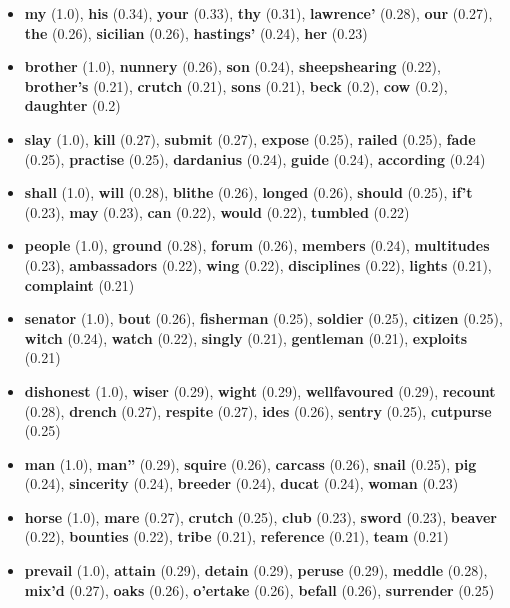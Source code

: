 \documentclass[answers]{exam}
\begin{document}
\begin{questions}
\begin{parts}
\begin{solution}
\begin{itemize}
\item \textbf{my} (1.0), \textbf{his} (0.34), \textbf{your} (0.33), \textbf{thy}
    (0.31), \textbf{lawrence’} (0.28), \textbf{our} (0.27), \textbf{the} (0.26),
    \textbf{sicilian} (0.26), \textbf{hastings’} (0.24), \textbf{her} (0.23)
\item \textbf{brother} (1.0), \textbf{nunnery} (0.26), \textbf{son} (0.24),
    \textbf{sheepshearing} (0.22), \textbf{brother’s} (0.21), \textbf{crutch}
    (0.21), \textbf{sons} (0.21), \textbf{beck} (0.2), \textbf{cow} (0.2),
    \textbf{daughter} (0.2)
\item \textbf{slay} (1.0), \textbf{kill} (0.27), \textbf{submit} (0.27),
    \textbf{expose} (0.25), \textbf{railed} (0.25), \textbf{fade} (0.25),
    \textbf{practise} (0.25), \textbf{dardanius} (0.24), \textbf{guide} (0.24),
    \textbf{according} (0.24)
\item \textbf{shall} (1.0), \textbf{will} (0.28), \textbf{blithe} (0.26),
    \textbf{longed} (0.26), \textbf{should} (0.25), \textbf{if’t} (0.23),
    \textbf{may} (0.23), \textbf{can} (0.22), \textbf{would} (0.22),
    \textbf{tumbled} (0.22)
\item \textbf{people} (1.0), \textbf{ground} (0.28), \textbf{forum} (0.26),
    \textbf{members} (0.24), \textbf{multitudes} (0.23), \textbf{ambassadors}
    (0.22), \textbf{wing} (0.22), \textbf{disciplines} (0.22), \textbf{lights}
    (0.21), \textbf{complaint} (0.21)
\item \textbf{senator} (1.0), \textbf{bout} (0.26), \textbf{fisherman} (0.25),
    \textbf{soldier} (0.25), \textbf{citizen} (0.25), \textbf{witch} (0.24),
    \textbf{watch} (0.22), \textbf{singly} (0.21), \textbf{gentleman} (0.21),
    \textbf{exploits} (0.21)
\item \textbf{dishonest} (1.0), \textbf{wiser} (0.29), \textbf{wight} (0.29),
    \textbf{wellfavoured} (0.29), \textbf{recount} (0.28), \textbf{drench}
    (0.27), \textbf{respite} (0.27), \textbf{ides} (0.26), \textbf{sentry}
    (0.25), \textbf{cutpurse} (0.25)
\item \textbf{man} (1.0), \textbf{man”} (0.29), \textbf{squire} (0.26),
    \textbf{carcass} (0.26), \textbf{snail} (0.25), \textbf{pig} (0.24),
    \textbf{sincerity} (0.24), \textbf{breeder} (0.24), \textbf{ducat} (0.24),
    \textbf{woman} (0.23)
\item \textbf{horse} (1.0), \textbf{mare} (0.27), \textbf{crutch} (0.25),
    \textbf{club} (0.23), \textbf{sword} (0.23), \textbf{beaver} (0.22),
    \textbf{bounties} (0.22), \textbf{tribe} (0.21), \textbf{reference} (0.21),
    \textbf{team} (0.21)
\item \textbf{prevail} (1.0), \textbf{attain} (0.29), \textbf{detain} (0.29),
    \textbf{peruse} (0.29), \textbf{meddle} (0.28), \textbf{mix’d} (0.27),
    \textbf{oaks} (0.26), \textbf{o’ertake} (0.26), \textbf{befall} (0.26),
    \textbf{surrender} (0.25)
\end{itemize}
\end{solution}
\end{parts}

\end{questions}
\end{document}
